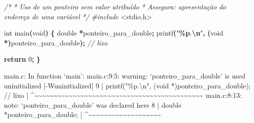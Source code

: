 \documentclass[
  11pt,
  a4paper,
]{scrbook}
\newenvironment{Shaded}{\begin{snugshade}}{\end{snugshade}}
\newcommand{\CommentTok}[1]{\textcolor[rgb]{0.56,0.35,0.01}{\textit{#1}}}
\newcommand{\ControlFlowTok}[1]{\textcolor[rgb]{0.13,0.29,0.53}{\textbf{#1}}}
\newcommand{\DataTypeTok}[1]{\textcolor[rgb]{0.13,0.29,0.53}{#1}}
\newcommand{\DecValTok}[1]{\textcolor[rgb]{0.00,0.00,0.81}{#1}}
\newcommand{\ImportTok}[1]{#1}
\newcommand{\NormalTok}[1]{#1}
\newcommand{\OperatorTok}[1]{\textcolor[rgb]{0.81,0.36,0.00}{\textbf{#1}}}
\newcommand{\PreprocessorTok}[1]{\textcolor[rgb]{0.56,0.35,0.01}{\textit{#1}}}
\newcommand{\SpecialCharTok}[1]{\textcolor[rgb]{0.81,0.36,0.00}{\textbf{#1}}}
\newcommand{\StringTok}[1]{\textcolor[rgb]{0.31,0.60,0.02}{#1}}
\begin{document}
\begin{Shaded}
\begin{Highlighting}[]
\CommentTok{/*}
\CommentTok{ * Uso de um ponteiro sem valor atribuído}
\CommentTok{ * Assegura: apresentação do endereço de uma variável}
\CommentTok{ */}
\PreprocessorTok{\#include }\ImportTok{\textless{}stdio.h\textgreater{}}

\DataTypeTok{int}\NormalTok{ main}\OperatorTok{(}\DataTypeTok{void}\OperatorTok{)} \OperatorTok{\{}
    \DataTypeTok{double} \OperatorTok{*}\NormalTok{ponteiro\_para\_double}\OperatorTok{;}
\NormalTok{    printf}\OperatorTok{(}\StringTok{"}\SpecialCharTok{\%p}\StringTok{.}\SpecialCharTok{\textbackslash{}n}\StringTok{"}\OperatorTok{,} \OperatorTok{(}\DataTypeTok{void} \OperatorTok{*)}\NormalTok{ponteiro\_para\_double}\OperatorTok{);}  \CommentTok{// lixo}

    \ControlFlowTok{return} \DecValTok{0}\OperatorTok{;}
\OperatorTok{\}}
\end{Highlighting}
\end{Shaded}

\begin{Shaded}
\begin{Highlighting}[]
\NormalTok{main.c: In function ‘main’:}
\NormalTok{main.c:9:5: warning: ‘ponteiro\_para\_double’ is used uninitialized }
\NormalTok{[{-}Wuninitialized]}
\NormalTok{    9 |     printf("\%p.\textbackslash{}n", (void *)ponteiro\_para\_double);  // lixo}
\NormalTok{      |     \^{}\textasciitilde{}\textasciitilde{}\textasciitilde{}\textasciitilde{}\textasciitilde{}\textasciitilde{}\textasciitilde{}\textasciitilde{}\textasciitilde{}\textasciitilde{}\textasciitilde{}\textasciitilde{}\textasciitilde{}\textasciitilde{}\textasciitilde{}\textasciitilde{}\textasciitilde{}\textasciitilde{}\textasciitilde{}\textasciitilde{}\textasciitilde{}\textasciitilde{}\textasciitilde{}\textasciitilde{}\textasciitilde{}\textasciitilde{}\textasciitilde{}\textasciitilde{}\textasciitilde{}\textasciitilde{}\textasciitilde{}\textasciitilde{}\textasciitilde{}\textasciitilde{}\textasciitilde{}\textasciitilde{}\textasciitilde{}\textasciitilde{}\textasciitilde{}\textasciitilde{}\textasciitilde{}\textasciitilde{}\textasciitilde{}\textasciitilde{}}
\NormalTok{main.c:8:13: note: ‘ponteiro\_para\_double’ was declared here}
\NormalTok{    8 |     double *ponteiro\_para\_double;}
\NormalTok{      |             \^{}\textasciitilde{}\textasciitilde{}\textasciitilde{}\textasciitilde{}\textasciitilde{}\textasciitilde{}\textasciitilde{}\textasciitilde{}\textasciitilde{}\textasciitilde{}\textasciitilde{}\textasciitilde{}\textasciitilde{}\textasciitilde{}\textasciitilde{}\textasciitilde{}\textasciitilde{}\textasciitilde{}\textasciitilde{}}
\end{Highlighting}
\end{Shaded}
\end{document}
